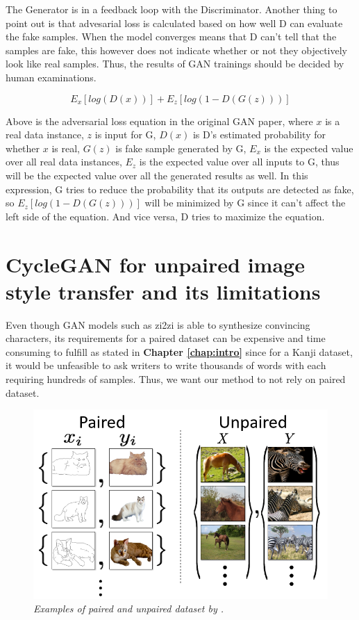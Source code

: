 \documentclass[12pt]{report}
\begin{document}
The Generator is in a feedback loop with the Discriminator. Another thing to point out is that advesarial loss is calculated based on how well D can evaluate the fake samples. When the model converges means that D can't tell that the samples are fake, this however does not indicate whether or not they objectively look like real samples. Thus, the results of GAN trainings should be decided by human examinations.

\[E_x[log(D(x))] + E_z[log(1 - D(G(z)))]\]

Above is the adversarial loss equation in the original GAN paper, where $x$ is a real data instance, $z$ is input for G, $D(x)$ is D's estimated probability for whether $x$ is real, $G(z)$ is fake sample generated by G, $E_x$ is the expected value over all real data instances, $E_z$ is the expected value over all inputs to G, thus will be the expected value over all the generated results as well. In this expression, G tries to reduce the probability that its outputs are detected as fake, so $E_z[log(1-D(G(z)))]$ will be minimized by G since it can't affect the left side of the equation. And vice versa, D tries to maximize the equation.

\section{CycleGAN for unpaired image style transfer and its limitations}

Even though GAN models such as zi2zi \cite{zi2zi} is able to synthesize convincing characters, its requirements for a paired dataset can be expensive and time consuming to fulfill as stated in \textbf{Chapter \ref{chap:intro}} since for a Kanji dataset, it would be unfeasible to ask writers to write thousands of words with each requiring hundreds of samples. Thus, we want our method to not rely on paired dataset. 

\begin{figure}[H]
	\centering
	\includegraphics[scale=0.8]{pair-unpair-dataset}
	\caption{\textit{Examples of paired and unpaired dataset by \cite{cycle-gan}.}}
	\label{fig:pair-unpair-dataset}
\end{figure}
\end{document}
